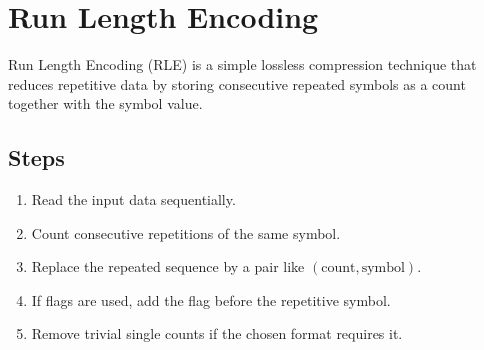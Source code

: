 \documentclass[11pt,a4paper]{book}
\newenvironment{definitionbox}[1][Definition]{%
    \begin{tcolorbox}[
        enhanced,
        breakable,
        colback=primaryblue!10,
        colframe=primaryblue!150,
        title=#1,
        fonttitle=\bfseries,
        sharp corners,
        boxrule=0.8pt,
        left=8pt,
        right=8pt,
        top=6pt,
        bottom=6pt
    ]
}{\end{tcolorbox}}
\begin{document}
\clearpage
\section{Run Length Encoding}

\begin{definitionbox}[Run Length Encoding]
Run Length Encoding (RLE) is a simple lossless compression technique that reduces repetitive data by storing consecutive repeated symbols as a count together with the symbol value.
\end{definitionbox}

\subsection{Steps}
\begin{enumerate}
    \item Read the input data sequentially.
    \item Count consecutive repetitions of the same symbol.
    \item Replace the repeated sequence by a pair like \((\text{count}, \text{symbol})\).
    \item If flags are used, add the flag before the repetitive symbol.
    \item Remove trivial single counts if the chosen format requires it.
\end{enumerate}
\end{document}
